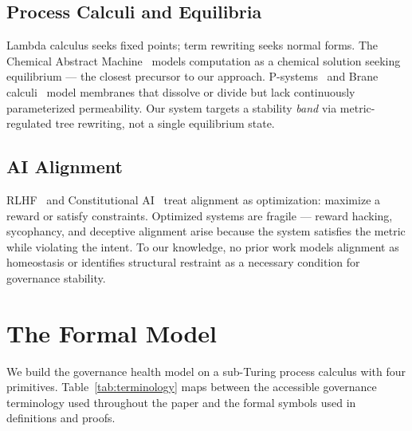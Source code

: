 \documentclass[sigconf,nonacm]{acmart}
\begin{document}
\subsection{Process Calculi and Equilibria}

Lambda calculus seeks fixed points; term rewriting seeks normal forms.
The Chemical Abstract Machine~\cite{berry1992} models computation as a
chemical solution seeking equilibrium --- the closest precursor to our
approach. P-systems~\cite{paun1998} and Brane calculi~\cite{cardelli2005}
model membranes that dissolve or divide but lack continuously
parameterized permeability. Our system targets a stability \emph{band}
via metric-regulated tree rewriting, not a single equilibrium state.

\subsection{AI Alignment}

RLHF~\cite{christiano2017} and Constitutional AI~\cite{bai2022} treat
alignment as optimization: maximize a reward or satisfy constraints.
Optimized systems are fragile --- reward hacking, sycophancy, and
deceptive alignment arise because the system satisfies the metric while
violating the intent. To our knowledge, no prior work models alignment as
homeostasis or identifies structural restraint as a necessary condition for
governance stability.


\section{The Formal Model}\label{sec:model}

We build the governance health model on a sub-Turing process calculus with
four primitives. Table~\ref{tab:terminology} maps between the accessible
governance terminology used throughout the paper and the formal symbols
used in definitions and proofs.
\end{document}
